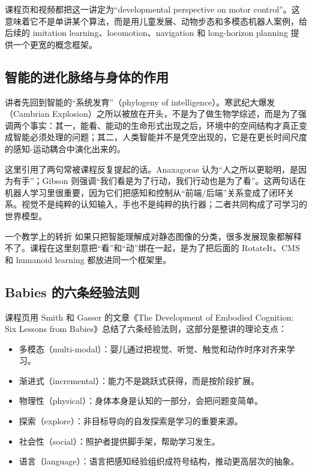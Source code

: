 \documentclass[a4paper]{article}
\begin{document}
课程页和视频都把这一讲定为“developmental perspective on motor control”。这意味着它不是单讲某个算法，而是用儿童发展、动物步态和多模态机器人案例，给后续的 imitation learning、locomotion、navigation 和 long-horizon planning 提供一个更宽的概念框架。

\subsection{智能的进化脉络与身体的作用}
讲者先回到智能的“系统发育”（phylogeny of intelligence）。寒武纪大爆发（Cambrian Explosion）之所以被放在开头，不是为了做生物学综述，而是为了强调两个事实：其一，能看、能动的生命形式出现之后，环境中的空间结构才真正变成智能必须处理的问题；其二，人类智能并不是凭空出现的，它是在更长时间尺度的感知-运动耦合中演化出来的。

这里引用了两句常被课程反复提起的话。Anaxagoras 认为“人之所以更聪明，是因为有手”；Gibson 则强调“我们看是为了行动，我们行动也是为了看”。这两句话在机器人学习里很重要，因为它们把感知和控制从“前端/后端”关系变成了闭环关系。视觉不是纯粹的认知输入，手也不是纯粹的执行器；二者共同构成了可学习的世界模型。

\begin{importantbox}{一个教学上的转折}
如果只把智能理解成对静态图像的分类，很多发展现象都解释不了。课程在这里刻意把“看”和“动”绑在一起，是为了把后面的 RotateIt、CMS 和 humanoid learning 都放进同一个框架里。
\end{importantbox}

\subsection{Babies 的六条经验法则}
课程页用 Smith 和 Gasser 的文章《The Development of Embodied Cognition: Six Lessons from Babies》总结了六条经验法则，这部分是整讲的理论支点：

\begin{itemize}
  \item 多模态（multi-modal）：婴儿通过把视觉、听觉、触觉和动作时序对齐来学习。
  \item 渐进式（incremental）：能力不是跳跃式获得，而是按阶段扩展。
  \item 物理性（physical）：身体本身是认知的一部分，会把问题变简单。
  \item 探索（explore）：非目标导向的自发探索是学习的重要来源。
  \item 社会性（social）：照护者提供脚手架，帮助学习发生。
  \item 语言（language）：语言把感知经验组织成符号结构，推动更高层次的抽象。
\end{itemize}
\end{document}

